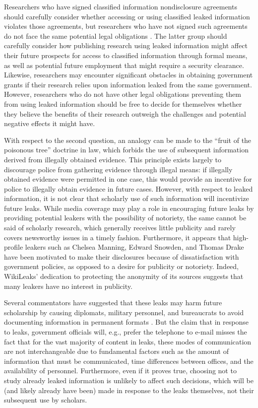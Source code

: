 \documentclass[12pt]{article}
\begin{document}
Researchers who have signed classified information nondisclosure 
agreements should 
carefully consider whether accessing or using classified leaked information violates those agreements, 
but researchers who have not signed such agreements do not face the same potential legal 
obligations \citep{cox2011wikileaks}. The latter group should carefully consider 
how publishing research using leaked information might affect their future prospects for access to 
classified information through formal means, as well as potential future employment that might require 
a security clearance.
Likewise, researchers may encounter significant obstacles in obtaining government grants if their research 
relies upon information leaked from the same government. 
However, researchers who do not 
have other legal obligations preventing them from using leaked information should be free to decide for themselves 
whether they believe the benefits of their research outweigh the challenges and potential negative effects it might have.

With respect to the second question, an analogy can be made to the ``fruit of the poisonous tree'' 
doctrine in law, which forbids the use of subsequent information derived from illegally obtained 
evidence. This principle exists largely to discourage police from 
gathering evidence through illegal means: if illegally obtained evidence were permitted in one 
case, this would provide an incentive for police to illegally obtain evidence in future cases. 
However, with respect to leaked information, it is not clear 
that scholarly use of such information will incentivize future leaks.
While media coverage may play a role in encouraging future leaks by providing 
potential leakers with the possibility of notoriety, the same cannot be said of scholarly research, 
which generally receives little publicity and rarely covers newsworthy issues in a timely fashion.
Furthermore, it appears that high-profile leakers such as Chelsea Manning, Edward Snowden, and 
Thomas Drake have 
been motivated to make their disclosures because of dissatisfaction with government policies, as 
opposed to a desire for publicity or notoriety. Indeed, WikiLeaks' dedication to protecting the anonymity of 
its sources suggests that many leakers have no interest in publicity.

Several commentators have suggested that these leaks may harm future scholarship by causing 
diplomats, military personnel, and bureaucrats to avoid documenting information in permanent 
formats \citep{drezner2010why,simmons2011international}. 
But the claim that in response to leaks, government 
officials will, e.g., prefer the telephone to e-mail misses the fact that for the vast majority of 
content in leaks, these modes of communication are not interchangeable due to fundamental factors such as the 
amount of information that must be communicated, time differences between offices, and the availability of 
personnel. Furthermore, even if it proves true, choosing not to study already leaked 
information is unlikely to affect 
such decisions, which will be (and likely already have been) made in response to 
the leaks themselves, not their subsequent use by scholars.
\end{document}
